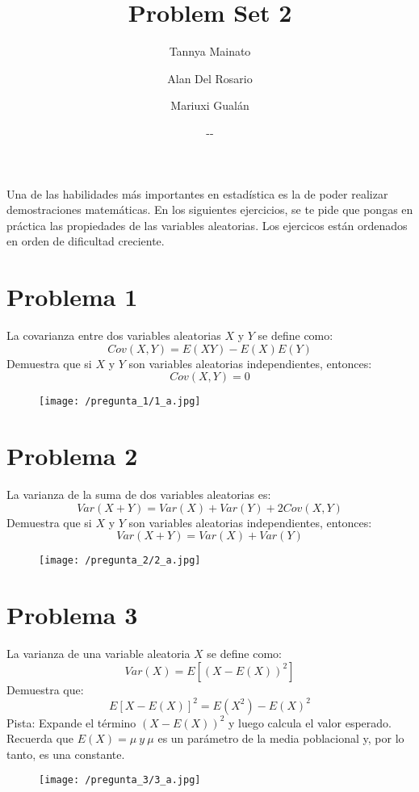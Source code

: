 \documentclass[a4paper]{article}
\title{Problem Set 2}
\author{Tannya Mainato \and Alan Del Rosario \and Mariuxi Gualán}
\date{\the\year-\twodigit\month-\twodigit\day}
\begin{document}
 
\maketitle

Una de las habilidades más importantes en estadística es la de poder realizar demostraciones matemáticas. En los siguientes ejercicios, se te pide que pongas en práctica las propiedades de las variables aleatorias. Los ejercicos están ordenados en orden de dificultad creciente. 

\section*{Problema 1}

La covarianza entre dos variables aleatorias $X$ y $Y$ se define como: 
$$Cov(X,Y)=E(XY)-E(X)E(Y)$$
Demuestra que si $X$ y $Y$ son variables aleatorias independientes, entonces: 
$$Cov(X,Y)=0$$

\begin{figure}[H]
	\centering
	\texttt{[image: /pregunta\_1/1\_a.jpg]}
	\end{figure}


\section*{Problema 2}

La varianza de la suma de dos variables aleatorias es: 
$$Var(X+Y)=Var(X)+Var(Y)+2Cov(X,Y)$$
Demuestra que si $X$ y $Y$ son variables aleatorias independientes, entonces: 
$$Var(X+Y)=Var(X)+Var(Y)$$

\begin{figure}[H]
	\centering
	\texttt{[image: /pregunta\_2/2\_a.jpg]}
\end{figure}

\section*{Problema 3}

La varianza de una variable aleatoria $X$ se define como: 
$$Var(X)=E[(X-E(X))^2]$$
Demuestra que: 
$$E[X-E(X)]^2=E(X^2)-E(X)^2$$
Pista: Expande el término $(X-E(X))^2$ y luego calcula el valor esperado. Recuerda que $E(X)=\mu \ y \ \mu$ es un parámetro de la media poblacional y, por lo tanto, es una constante. 

\begin{figure}[H]
	\centering
	\texttt{[image: /pregunta\_3/3\_a.jpg]}
\end{figure}
\end{document}
